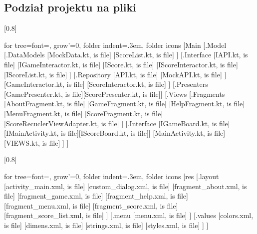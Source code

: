 \documentclass[12pt,a4paper]{article}
\begin{document}
		\subsection{Podział projektu na pliki}
		\begin{multicols}{2}
\scalebox{0.9}[0.8]{
			\begin{forest}
				for tree={font=\sffamily, grow'=0,
    folder indent=.3em, folder icons}
    	[Main
    	    [.Model
    	        [.DataModels
    	        [MockData.kt, is file]
    	        [ScoreList.kt, is file]
    	        ]
    	        [.Interface
    	        [IAPI.kt, is file]
    	        [IGameInteractor.kt, is file]
    	        [IScore.kt, is file]
    	        [IScoreInteractor.kt, is file]
    	        [IScoreList.kt, is file]
    	        ]
    	        [.Repository
    	        [API.kt, is file]
    	        [MockAPI.kt, is file]
    	        ]
    	        [GameInteractor.kt, is file]
    	        [ScoreInteractor.kt, is file]
    	    ]
    	    [.Presenters
    	    [GamePresenter.kt, is file][ScorePresenter.kt, is file]]
    	    [.Views
    	    [.Fragments
    	    [AboutFragment.kt, is file]
    	    [GameFragment.kt, is file]
    	    [HelpFragment.kt, is file]
    	    [MenuFragment.kt, is file]
    	    [ScoreFragment.kt, is file]
    	    [ScoreRecuclerViewAdapter.kt, is file]
    	    ]
    	    [.Interface [IGameBoard.kt, is file][IMainActivity.kt, is file][IScoreBoard.kt, is file]]
    	    [MainActivity.kt, is file]
    	    [VIEWS.kt, is file]
    	    ]
    	]
			\end{forest}
			}
\scalebox{0.9}[0.8]{
			\begin{forest}
				for tree={font=\sffamily, grow'=0,
                folder indent=.3em, folder icons}
    [res
        [.layout 
            [activity\_main.xml, is file]
            [custom\_dialog.xml, is file]
            [fragment\_about.xml, is file]
            [fragment\_game.xml, is file]
            [fragment\_help.xml, is file]
            [fragment\_menu.xml, is file]
            [fragment\_score.xml, is file]
            [fragment\_score\_list.xml, is file]
        ]
        [.menu 
            [menu.xml, is file]
        ]
        [.values
            [colors.xml, is file]
            [dimens.xml, is file]
            [strings.xml, is file]
            [styles.xml, is file]
        ]
    ]
    \end{forest}
}
		\end{multicols}
\clearpage 
\end{document}
